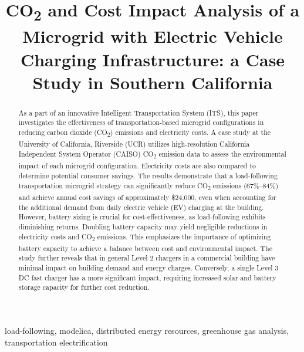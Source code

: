 \documentclass[conference]{IEEEtran}
\begin{document}
\title{CO\textsubscript{2} and Cost Impact Analysis of a Microgrid  with Electric Vehicle Charging Infrastructure: a Case Study in Southern California}

\author{
}
\maketitle

\begin{abstract}
	 As a part of  an innovative Intelligent Transportation System (ITS), this paper investigates the effectiveness of transportation-based microgrid configurations in reducing carbon dioxide (CO\textsubscript{2}) emissions and electricity costs. A case study at the University of California, Riverside (UCR) utilizes high-resolution California Independent System Operator (CAISO) CO\textsubscript{2}  emission data to assess the environmental impact of each microgrid configuration. Electricity costs are also compared to determine potential consumer savings. The results demonstrate that a load-following transportation microgrid strategy can significantly reduce CO\textsubscript{2}  emissions (67\%–84\%) and achieve annual cost savings of approximately \$24,000, even when accounting for the additional demand from daily electric vehicle (EV) charging at the building. However, battery sizing is crucial for cost-effectiveness, as load-following exhibits diminishing returns. Doubling battery capacity may yield negligible reductions in electricity costs and CO\textsubscript{2}  emissions. This emphasizes the importance of optimizing battery capacity to achieve a balance between cost and environmental impact. The study further reveals that in general Level 2 chargers in a commercial building have minimal impact on building demand and energy charges. Conversely, a single Level 3 DC fast charger has a more significant impact, requiring increased solar and battery storage capacity for further cost reduction. %
\end{abstract}
\begin{IEEEkeywords}
	load-following, modelica, distributed energy resources, greenhouse gas analysis, transportation electrification  
\end{IEEEkeywords}
\end{document}
